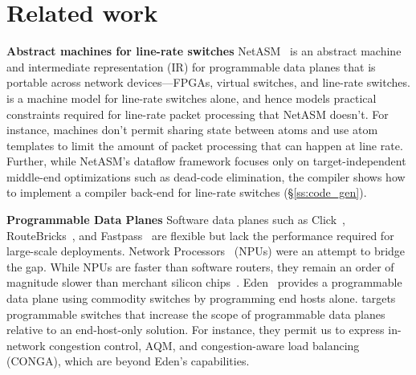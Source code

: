 \section{Related work}
\label{s:related}

\textbf{Abstract machines for line-rate switches}
NetASM~\cite{netasm} is an abstract machine and intermediate representation
(IR) for programmable data planes that is portable across network
devices---FPGAs, virtual switches, and line-rate switches.  \absmachine is a
machine model for line-rate switches alone, and hence models practical
constraints required for line-rate packet processing that NetASM doesn't. For
instance, \absmachine machines don't permit sharing state between atoms and use
atom templates to limit the amount of packet processing that can happen at line
rate. Further, while NetASM's dataflow framework focuses only on
target-independent middle-end optimizations such as dead-code elimination, the
\pktlanguage compiler shows how to implement a compiler back-end for line-rate
switches (\S\ref{ss:code_gen}).

\textbf{Programmable Data Planes}
Software data planes such as Click~\cite{click},
RouteBricks~\cite{routebricks}, and Fastpass~\cite{fastpass} are flexible but
lack the performance required for large-scale deployments. Network
Processors~\cite{ixp2800, ixp4xx} (NPUs) were an attempt to bridge the gap.
While NPUs are faster than software routers, they remain an order of magnitude
slower than merchant silicon chips~\cite{rmt}. Eden~\cite{eden} provides a
programmable data plane using commodity switches by programming end hosts
alone. \pktlanguage targets programmable switches that increase the scope of
programmable data planes relative to an end-host-only solution. For instance,
they permit us to express in-network congestion control, AQM, and
congestion-aware load balancing (CONGA), which are beyond Eden's capabilities.

